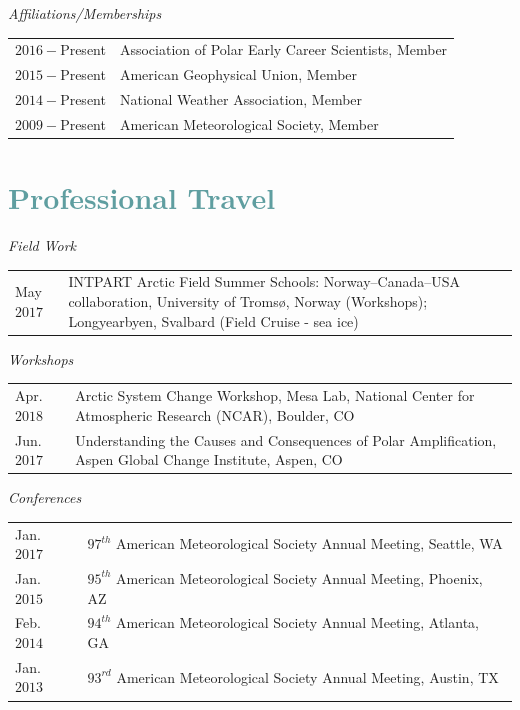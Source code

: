 \documentclass[margin,line,palatino,courier,10pt]{res}
\begin{document}
\begin{resume}
\textit{Affiliations/Memberships}
\vspace*{0.05in}\\
\begin{tabular}{@{}p{0.8in}p{4in}}
$2016 - $Present & Association of Polar Early Career Scientists, Member\\ 
$2015 - $Present & American Geophysical Union, Member\\
$2014 -$Present & National Weather Association, Member\\
$2009 -$Present & American Meteorological Society, Member\\
\end{tabular}

\section{\sc \textcolor{CadetBlue}{\large{Professional Travel}}}
\textit{Field Work}
\vspace*{0.05in}\\
\begin{tabular}{@{}p{0.8in}p{4in}}
May $2017$ & INTPART Arctic Field Summer Schools: Norway--Canada--USA collaboration, University of Troms\o, Norway (Workshops); Longyearbyen, Svalbard (Field Cruise - sea ice)
\end{tabular}

\textit{Workshops}
\vspace*{0.05in}\\
\begin{tabular}{@{}p{0.8in}p{4in}}
Apr. $2018$ & Arctic System Change Workshop, Mesa Lab, National Center for Atmospheric Research (NCAR), Boulder, CO\\
Jun. $2017$ & Understanding the Causes and Consequences of Polar Amplification, Aspen Global Change Institute, Aspen, CO
\end{tabular}

\textit{Conferences}
\vspace*{0.05in}\\
\begin{tabular}{@{}p{0.8in}p{4in}}
Jan. $2017$ & $97^ {th} $ American Meteorological Society Annual Meeting, Seattle, WA \\
Jan. $2015$ & $95^ {th} $ American Meteorological Society Annual Meeting, Phoenix, AZ \\
Feb. $2014$ & $94^ {th} $ American Meteorological Society Annual Meeting, Atlanta, GA \\
Jan. $2013$ & $93^ {rd} $ American Meteorological Society Annual Meeting, Austin, TX \\
\end{tabular}


\end{resume}
\end{document}

